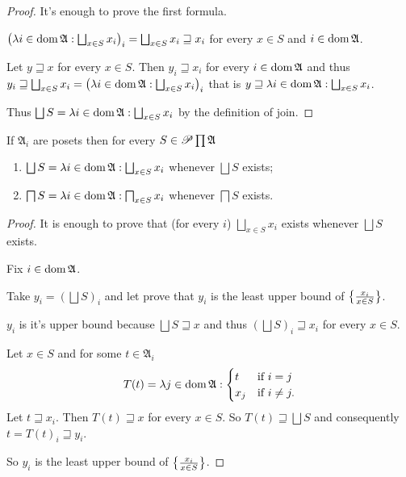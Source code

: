 \begin{proof}
It's enough to prove the first formula.

$\left(\lambda i\in\operatorname{dom}\mathfrak{A}:\bigsqcup_{x\in S}x_{i}\right)_{i}=\bigsqcup_{x\in S}x_{i}\sqsupseteq x_{i}$
for every $x\in S$ and $i\in\operatorname{dom}\mathfrak{A}$.

Let $y\sqsupseteq x$ for every $x\in S$. Then $y_{i}\sqsupseteq x_{i}$
for every $i\in\operatorname{dom}\mathfrak{A}$ and thus $y_{i}\sqsupseteq\bigsqcup_{x\in S}x_{i}=\left(\lambda i\in\operatorname{dom}\mathfrak{A}:\bigsqcup_{x\in S}x_{i}\right)_{i}$
that is $y\sqsupseteq\lambda i\in\operatorname{dom}\mathfrak{A}:\bigsqcup_{x\in S}x_{i}$.

Thus $\bigsqcup S=\lambda i\in\operatorname{dom}\mathfrak{A}:\bigsqcup_{x\in S}x_{i}$
by the definition of join.\end{proof}
\begin{cor}
\label{prod-join2}If $\mathfrak{A}_{i}$ are posets then for every
$S\in\mathscr{P}\prod\mathfrak{A}$
\begin{enumerate}
\item $\bigsqcup S=\lambda i\in\operatorname{dom}\mathfrak{A}:\bigsqcup_{x\in S}x_{i}$
whenever $\bigsqcup S$ exists;
\item $\bigsqcap S=\lambda i\in\operatorname{dom}\mathfrak{A}:\bigsqcap_{x\in S}x_{i}$
whenever $\bigsqcap S$ exists.
\end{enumerate}
\end{cor}
\begin{proof}
It is enough to prove that (for every $i$) $\bigsqcup_{x\in S}x_{i}$
exists whenever $\bigsqcup S$ exists.

Fix $i\in\operatorname{dom}\mathfrak{A}$.

Take $y_{i}=\left(\bigsqcup S\right)_{i}$ and let prove that $y_{i}$
is the least upper bound of $\left\{ \frac{x_{i}}{x\in S}\right\}$.

$y_{i}$ is it's upper bound because $\bigsqcup S\sqsupseteq x$
and thus $\left(\bigsqcup S\right)_{i}\sqsupseteq x_{i}$ for every
$x\in S$.

Let $x\in S$ and for some $t\in\mathfrak{A}_{i}$
\[
T(t)=\lambda j\in\operatorname{dom}\mathfrak{A}:\begin{cases}
t & \text{if }i=j\\
x_{j} & \text{if }i\ne j.
\end{cases}
\]
Let $t\sqsupseteq x_{i}$. Then $T(t)\sqsupseteq x$ for every $x\in S$.
So $T(t)\sqsupseteq\bigsqcup S$ and consequently $t=T(t)_{i}\sqsupseteq y_{i}$.

So $y_{i}$ is the least upper bound of $\left\{ \frac{x_{i}}{x\in S}\right\}$.\end{proof}
